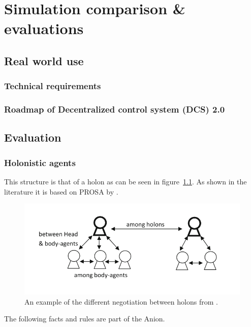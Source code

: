 \chapter{Simulation comparison \& evaluations}


\section{Real world use}
\subsection{Technical requirements}
\subsection{Roadmap of Decentralized control system (DCS) 2.0 }


\section{Evaluation}

\subsection{Holonistic agents}

This structure is that of a holon as can be seen in figure~\cref{fig:holonexample}. As shown in the literature it is based on PROSA by \citet{van1998reference}.
\begin{figure}
	\centering
	\includegraphics[width=0.7\linewidth]{img/holon_example}
	\caption{An example of the different negotiation between holons from \citet{beheshti2016negotiations}.}
	\label{fig:holonexample}
\end{figure}

The following facts and rules are part of the Anion.

